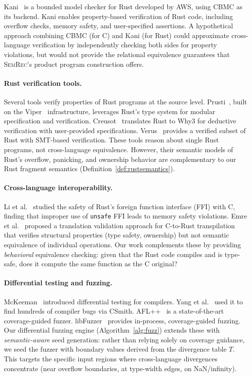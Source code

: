 \documentclass[11pt]{article}
\begin{document}
Kani~\cite{kani2022} is a bounded model checker for Rust developed by AWS, using CBMC as its backend. Kani enables property-based verification of Rust code, including overflow checks, memory safety, and user-specified assertions. A hypothetical approach combining CBMC (for C) and Kani (for Rust) could approximate cross-language verification by independently checking both sides for property violations, but would not provide the relational equivalence guarantees that \textsc{SemRec}'s product program construction offers.

\paragraph{Rust verification tools.}
Several tools verify properties of Rust programs at the source level. Prusti~\cite{astrauskas2020}, built on the Viper~\cite{muller2016} infrastructure, leverages Rust's type system for modular specification and verification. Creusot~\cite{denis2022creusot} translates Rust to Why3 for deductive verification with user-provided specifications. Verus~\cite{lattuada2023verus} provides a verified subset of Rust with SMT-based verification. These tools reason about single Rust programs, not cross-language equivalence. However, their semantic models of Rust's overflow, panicking, and ownership behavior are complementary to our Rust fragment semantics (Definition~\ref{def:rustsemantics}).

\paragraph{Cross-language interoperability.}
Li et al.~\cite{li2022} studied the safety of Rust's foreign function interface (FFI) with C, finding that improper use of \texttt{unsafe} FFI leads to memory safety violations. Emre et al.~\cite{emre2021} proposed a translation validation approach for C-to-Rust transpilation that verifies structural properties (type safety, ownership) but not semantic equivalence of individual operations. Our work complements these by providing \emph{behavioral} equivalence checking: given that the Rust code compiles and is type-safe, does it compute the same function as the C original?

\paragraph{Differential testing and fuzzing.}
McKeeman~\cite{mckeeman1998} introduced differential testing for compilers. Yang et al.~\cite{yang2011} used it to find hundreds of compiler bugs via CSmith. AFL++~\cite{fioraldi2020} is a state-of-the-art coverage-guided fuzzer. libFuzzer~\cite{libfuzzer} provides in-process, coverage-guided fuzzing. Our differential fuzzing engine (Algorithm~\ref{alg:fuzz}) extends these with \emph{semantic-aware} seed generation: rather than relying solely on coverage guidance, we seed the fuzzer with boundary values derived from the divergence table $T$. This targets the specific input regions where cross-language divergences concentrate (near overflow boundaries, at type-width edges, on NaN/infinity).
\end{document}
